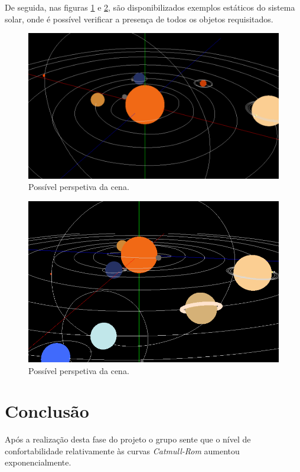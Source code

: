 \documentclass[a4paper]{article}
\begin{document}
De seguida, nas figuras \ref{img:scene_1} e \ref{img:scene_2}, são disponibilizados exemplos estáticos do sistema solar, onde é possível verificar a presença de todos os objetos requisitados.

\begin{figure}[H]
\centering
\includegraphics[scale=0.3]{scene_1.png}
\caption{Possível perspetiva da cena.}
\label{img:scene_1}
\end{figure}

\begin{figure}[H]
\centering
\includegraphics[scale=0.36]{scene_2.png}
\caption{Possível perspetiva da cena.}
\label{img:scene_2}
\end{figure}


\section{Conclusão}
\label{sec:conclusao}

Após a realização desta fase do projeto o grupo sente que o nível de confortabilidade relativamente às curvas \textit{Catmull-Rom} aumentou exponencialmente.
\end{document}
